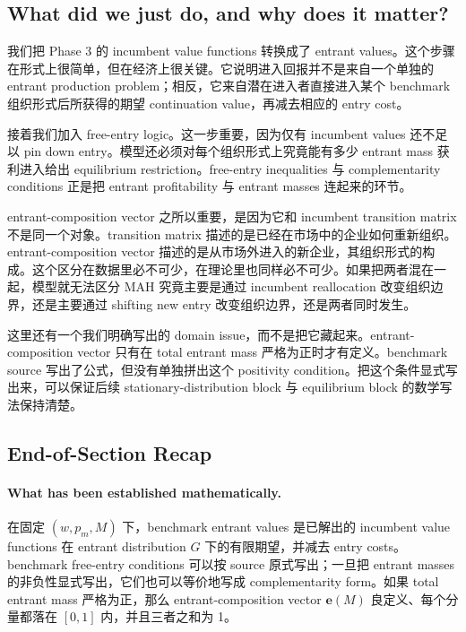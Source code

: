 \subsection{What did we just do, and why does it matter?}

我们把 Phase 3 的 incumbent value functions 转换成了 entrant values。这个步骤在形式上很简单，但在经济上很关键。它说明进入回报并不是来自一个单独的 entrant production problem；相反，它来自潜在进入者直接进入某个 benchmark 组织形式后所获得的期望 continuation value，再减去相应的 entry cost。

接着我们加入 free-entry logic。这一步重要，因为仅有 incumbent values 还不足以 pin down entry。模型还必须对每个组织形式上究竟能有多少 entrant mass 获利进入给出 equilibrium restriction。free-entry inequalities 与 complementarity conditions 正是把 entrant profitability 与 entrant masses 连起来的环节。

entrant-composition vector 之所以重要，是因为它和 incumbent transition matrix 不是同一个对象。transition matrix 描述的是已经在市场中的企业如何重新组织。entrant-composition vector 描述的是从市场外进入的新企业，其组织形式的构成。这个区分在数据里必不可少，在理论里也同样必不可少。如果把两者混在一起，模型就无法区分 MAH 究竟主要是通过 incumbent reallocation 改变组织边界，还是主要通过 shifting new entry 改变组织边界，还是两者同时发生。

这里还有一个我们明确写出的 domain issue，而不是把它藏起来。entrant-composition vector 只有在 total entrant mass 严格为正时才有定义。benchmark source 写出了公式，但没有单独拼出这个 positivity condition。把这个条件显式写出来，可以保证后续 stationary-distribution block 与 equilibrium block 的数学写法保持清楚。

\subsection{End-of-Section Recap}

\paragraph{What has been established mathematically.}
在固定 $(w,p_m,M)$ 下，benchmark entrant values 是已解出的 incumbent value functions 在 entrant distribution $G$ 下的有限期望，并减去 entry costs。benchmark free-entry conditions 可以按 source 原式写出；一旦把 entrant masses 的非负性显式写出，它们也可以等价地写成 complementarity form。如果 total entrant mass 严格为正，那么 entrant-composition vector $\mathbf e(M)$ 良定义、每个分量都落在 $[0,1]$ 内，并且三者之和为 1。

